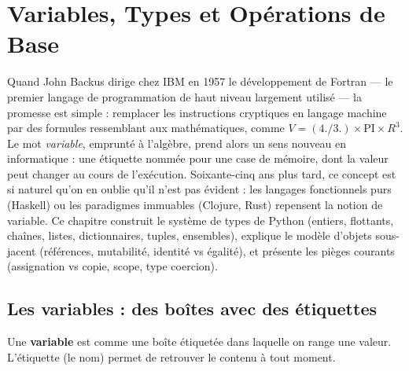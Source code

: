\chapter{Variables, Types et Op\'erations de Base}
\label{ch:variables}

Quand John Backus dirige chez IBM en 1957 le développement de Fortran --- le premier langage de programmation de haut niveau largement utilisé --- la promesse est simple : remplacer les instructions cryptiques en langage machine par des formules ressemblant aux mathématiques, comme $V = (4./3.) \times \text{PI} \times R^3$. Le mot \emph{variable}, emprunté à l'algèbre, prend alors un sens nouveau en informatique : une étiquette nommée pour une case de mémoire, dont la valeur peut changer au cours de l'exécution. Soixante-cinq ans plus tard, ce concept est si naturel qu'on en oublie qu'il n'est pas évident : les langages fonctionnels purs (Haskell) ou les paradigmes immuables (Clojure, Rust) repensent la notion de variable. Ce chapitre construit le système de types de Python (entiers, flottants, chaînes, listes, dictionnaires, tuples, ensembles), explique le modèle d'objets sous-jacent (références, mutabilité, identité vs égalité), et présente les pièges courants (assignation vs copie, scope, type coercion).

\section{Les variables : des bo\^ites avec des \'etiquettes}

\begin{intuition}
Une \textbf{variable} est comme une bo\^ite \'etiquet\'ee dans laquelle on range une valeur. L'\'etiquette (le nom) permet de retrouver le contenu \`a tout moment.
\end{intuition}

\begin{center}
\end{center}

